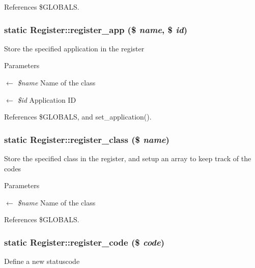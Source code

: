 References \$GLOBALS.

\subsubsection[{register\_\-app}]{\setlength{\rightskip}{0pt plus 5cm}static Register::register\_\-app (\$ {\em name}, \/  \$ {\em id})}\label{classRegister_ac547568c4a7272fdaf65cb2825eccec3}
Store the specified application in the register


\begin{DoxyParams}{Parameters}
\item[\mbox{$\leftarrow$} {\em \$name}]Name of the class \item[\mbox{$\leftarrow$} {\em \$id}]Application ID \end{DoxyParams}


References \$GLOBALS, and set\_\-application().

\subsubsection[{register\_\-class}]{\setlength{\rightskip}{0pt plus 5cm}static Register::register\_\-class (\$ {\em name})}\label{classRegister_a58300f74d002f1306a03baf12af0f02c}
Store the specified class in the register, and setup an array to keep track of the codes


\begin{DoxyParams}{Parameters}
\item[\mbox{$\leftarrow$} {\em \$name}]Name of the class \end{DoxyParams}


References \$GLOBALS.

\subsubsection[{register\_\-code}]{\setlength{\rightskip}{0pt plus 5cm}static Register::register\_\-code (\$ {\em code})}\label{classRegister_a875fd1f32f0746aa9e0e00b053c7389a}
Define a new statuscode


